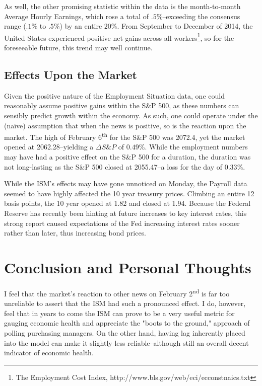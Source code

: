 \documentclass[11pt,letterpaper,english]{article}
\begin{document}
\noindent As well, the other promising statistic within the data is the month-to-month Average Hourly Earnings, which rose a total of $.5\%$--exceeding the consensus range ($.1\%$ to $.5\%$) by an entire $20\%$. From September to December of 2014, the United States experienced positive net gains across all workers\footnote[1]{The Employment Cost Index, http://www.bls.gov/web/eci/ecconstnaics.txt}, so for the foreseeable future, this trend may well continue.

\subsection{Effects Upon the Market}
Given the positive nature of the Employment Situation data, one could reasonably assume positive gains within the S\&P 500, as these numbers can sensibly predict growth within the economy. As such, one could operate under the (naïve) assumption that when the news is positive, so is the reaction upon the market. The high of February 6\textsuperscript{th} for the S\&P 500 was 2072.4, yet the market opened at 2062.28--yielding a $\Delta{S\&P}$ of $0.49\%$. While the employment numbers may have had a positive effect on the S\&P 500 for a duration, the duration was not long-lasting as the S\&P 500 closed at 2055.47--a loss for the day of $0.33\%$.

\vspace{5mm}

\noindent While the ISM's effects may have gone unnoticed on Monday, the Payroll data seemed to have highly affected the 10 year treasury prices. Climbing an entire 12 basis points, the 10 year opened at 1.82 and closed at 1.94. Because the Federal Reserve has recently been hinting at future increases to key interest rates, this strong report caused expectations of the Fed increasing interest rates sooner rather than later, thus increasing bond prices.

\section{Conclusion and Personal Thoughts}
I feel that the market's reaction to other news on February 2\textsuperscript{nd} is far too unreliable to assert that the ISM had such a pronounced effect. I do, however, feel that in years to come the ISM can prove to be a very useful metric for gauging economic health and appreciate the "boots to the ground," approach of polling purchasing managers. On the other hand, having lag inherently placed into the model can make it slightly less reliable--although still an overall decent indicator of economic health.
\vspace{5mm}
\end{document}
